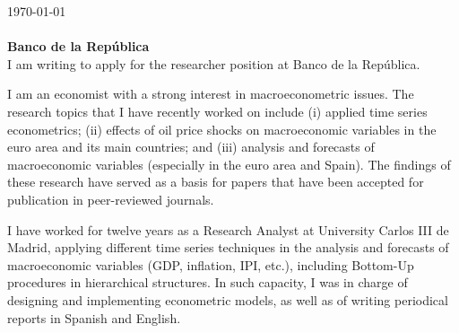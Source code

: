\documentclass{letter}\usepackage[]{graphicx}\usepackage[]{color}
\begin{document}
\today{}
\\
\\
\textbf{Banco de la República}\\





I am writing to apply for the researcher position at Banco de la República.

I am an economist with a strong interest in macroeconometric issues. The research topics that I have recently worked on include (i) applied time series econometrics; (ii) effects of oil price shocks on macroeconomic variables in the euro area and its main countries; and (iii) analysis and forecasts of macroeconomic variables (especially in the euro area and Spain). The findings of these research have served as a basis for papers that have been accepted for publication in peer-reviewed journals.

I have worked for twelve years as a Research Analyst at University Carlos III de Madrid, applying different time series techniques in the analysis and forecasts of macroeconomic variables (GDP, inflation, IPI, etc.), including Bottom-Up procedures in hierarchical structures. In such capacity, I was in charge of designing and implementing econometric models, as well as of writing periodical reports in Spanish and English. 
\end{document}
